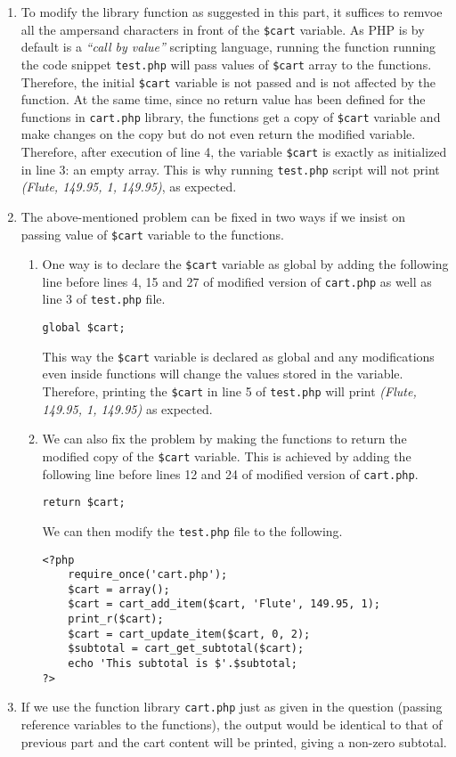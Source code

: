 \begin{enumerate}
\item To modify the library function as suggested in this part, it suffices to remvoe all the ampersand characters in front of the \texttt{\$cart} variable. As PHP is by default is a \textit{``call by value''} scripting language, running the function running the code snippet \texttt{test.php} will pass values of \texttt{\$cart} array to the functions. Therefore, the initial \texttt{\$cart} variable is not passed and is not affected by the function. At the same time, since no return value has been defined for the functions in \texttt{cart.php} library, the functions get a copy of \texttt{\$cart} variable and make changes on the copy but do not even return the modified variable. Therefore, after execution of line 4, the variable \texttt{\$cart} is exactly as initialized in line 3: an empty array. This is why running \texttt{test.php} script will not print \textit{(Flute, 149.95, 1, 149.95)}, as expected.

\item The above-mentioned problem can be fixed in two ways if we insist on passing value of \texttt{\$cart} variable to the functions.
\begin{enumerate}
\item One way is to declare the \texttt{\$cart} variable as global by adding the following line before lines 4, 15 and 27 of modified version of \texttt{cart.php} as well as line 3 of \texttt{test.php} file.
\lstset{language=php, numbers=none}
\begin{lstlisting}
global $cart;
\end{lstlisting}
This way the \texttt{\$cart} variable is declared as global and any modifications even inside functions will change the values stored in the variable. Therefore, printing the \texttt{\$cart} in line 5 of \texttt{test.php} will print \textit{(Flute, 149.95, 1, 149.95)} as expected.

\item We can also fix the problem by making the functions to return the modified copy of the \texttt{\$cart} variable. This is achieved by adding the following line before lines 12 and 24 of modified version of \texttt{cart.php}.
\lstset{language=php, numbers=none}
\begin{lstlisting}
return $cart;
\end{lstlisting}

We can then modify the \texttt{test.php} file to the following.
\lstset{language=php, tabsize=2, numbers=left}
\begin{lstlisting}
<?php
	require_once('cart.php');
	$cart = array();
	$cart = cart_add_item($cart, 'Flute', 149.95, 1);
	print_r($cart);
	$cart = cart_update_item($cart, 0, 2);
	$subtotal = cart_get_subtotal($cart);
	echo 'This subtotal is $'.$subtotal;
?>
\end{lstlisting}
\end{enumerate}
\item If we use the function library \texttt{cart.php} just as given in the question (passing reference variables to the functions), the output would be identical to that of previous part and the cart content will be printed, giving a non-zero subtotal.


\end{enumerate}
